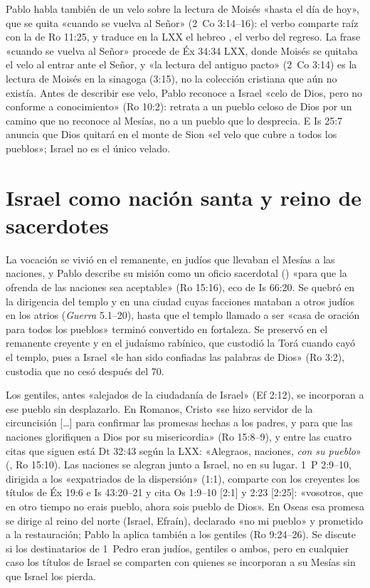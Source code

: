 Pablo habla también de un velo sobre la lectura de Moisés «hasta el día de hoy», que se quita «cuando se vuelva al Señor» (2~Co 3:14--16): el verbo  comparte raíz con la  de Ro 11:25, y  traduce en la LXX el hebreo , el verbo del regreso. La frase «cuando se vuelva al Señor» procede de Éx 34:34 LXX, donde Moisés se quitaba el velo al entrar ante el Señor, y «la lectura del antiguo pacto» (2~Co 3:14) es la lectura de Moisés en la sinagoga (3:15), no la colección cristiana que aún no existía. Antes de describir ese velo, Pablo reconoce a Israel «celo de Dios, pero no conforme a conocimiento» (Ro 10:2): retrata a un pueblo celoso de Dios por un camino que no reconoce al Mesías, no a un pueblo que lo desprecia. E Is 25:7 anuncia que Dios quitará en el monte de Sion «el velo que cubre a todos los pueblos»; Israel no es el único velado.

\section{Israel como nación santa y reino de sacerdotes}

La vocación se vivió en el remanente, en judíos que llevaban el Mesías a las naciones, y Pablo describe su misión como un oficio sacerdotal () «para que la ofrenda de las naciones sea aceptable» (Ro 15:16), eco de Is 66:20. Se quebró en la dirigencia del templo y en una ciudad cuyas facciones mataban a otros judíos en los atrios (\emph{Guerra} 5.1--20), hasta que el templo llamado a ser «casa de oración para todos los pueblos» terminó convertido en fortaleza. Se preservó en el remanente creyente y en el judaísmo rabínico, que custodió la Torá cuando cayó el templo, pues a Israel «le han sido confiadas las palabras de Dios» (Ro 3:2), custodia que no cesó después del 70.

Los gentiles, antes «alejados de la ciudadanía de Israel» (Ef 2:12), se incorporan a ese pueblo sin desplazarlo. En Romanos, Cristo «se hizo servidor de la circuncisión [\ldots] para confirmar las promesas hechas a los padres, y para que las naciones glorifiquen a Dios por su misericordia» (Ro 15:8--9), y entre las cuatro citas que siguen está Dt 32:43 según la LXX: «Alegraos, naciones, \emph{con su pueblo}» (, Ro 15:10). Las naciones se alegran junto a Israel, no en su lugar. 1~P 2:9--10, dirigida a los «expatriados de la dispersión» (1:1), comparte con los creyentes los títulos de Éx 19:6 e Is 43:20--21 y cita Os 1:9--10 [2:1] y 2:23 [2:25]: «vosotros, que en otro tiempo no erais pueblo, ahora sois pueblo de Dios». En Oseas esa promesa se dirige al reino del norte (Israel, Efraín), declarado «no mi pueblo» y prometido a la restauración; Pablo la aplica también a los gentiles (Ro 9:24--26). Se discute si los destinatarios de 1~Pedro eran judíos, gentiles o ambos, pero en cualquier caso los títulos de Israel se comparten con quienes se incorporan a su Mesías sin que Israel los pierda.

